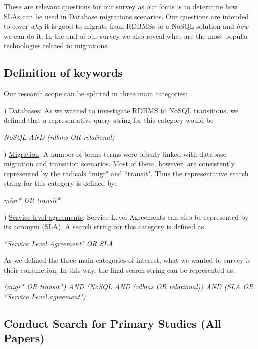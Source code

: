 \documentclass[a4paper]{IEEEtran}
\begin{document}
\bigskip

These are relevant questions for our survey as our focus is to determine how SLAs can be used in Database migrations scenarios. 
Our questions are intended to cover \textit{why} it is good to migrate from RDBMSs to a NoSQL solution and \textit{how} we can do it. In the end of our survey we also reveal what are the most popular technologies related to migrations.

\subsection{Definition of keywords}
\label{sec:sok}

Our research scope can be splitted in three main categories: 

) \underline{Databases}: As we wanted to investigate RDBMS to NoSQL transitions, we defined that a representative query string for this category would be 

\begin{center}
\textit{NoSQL AND (rdbms OR relational)}
\end{center}

) \underline{Migration}: A number of terms terms were oftenly linked with database migration and transition scenarios. Most of them, however, are consistently represented by the radicals ``migr" and ``transit". Thus the representative search string for this category is defined by: 


\begin{center}
\textit{migr* OR transit*}
\end{center}


) \underline{Service level agreements}: Service Level Agreements can also be represented by its acronym (SLA). 
A search string for this category is defined as 
\begin{center}
\textit{``Service Level Agreement" OR SLA}
\end{center}

As we defined the three main categories of interest, what we wanted to survey is their conjunction. 
In this way, the final search string can be represented as: 

\begin{center}
\textit{(migr* OR transit*) AND (NoSQL AND (rdbms OR relational)) AND (SLA OR ``Service Level agreement") 
}\end{center}

\subsection{Conduct Search for Primary Studies (All Papers)}
\label{sec:allPapers}
\end{document}
